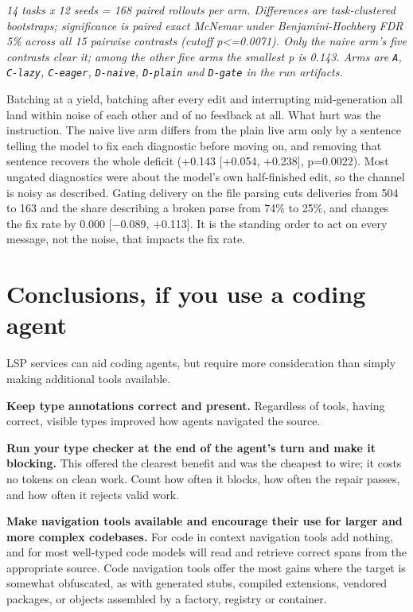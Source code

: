 \documentclass[
]{article}
\begin{document}
\emph{14 tasks x 12 seeds = 168 paired rollouts per arm. Differences are
task-clustered bootstraps; significance is paired exact McNemar under
Benjamini-Hochberg FDR 5\% across all 15 pairwise contrasts (cutoff
p\textless=0.0071). Only the naive arm's five contrasts clear it; among
the other five arms the smallest p is 0.143. Arms are \texttt{A},
\texttt{C-lazy}, \texttt{C-eager}, \texttt{D-naive}, \texttt{D-plain}
and \texttt{D-gate} in the run artifacts.}

Batching at a yield, batching after every edit and interrupting
mid-generation all land within noise of each other and of no feedback at
all. What hurt was the instruction. The naive live arm differs from the
plain live arm only by a sentence telling the model to fix each
diagnostic before moving on, and removing that sentence recovers the
whole deficit (+0.143 {[}+0.054, +0.238{]}, p=0.0022). Most ungated
diagnostics were about the model's own half-finished edit, so the
channel is noisy as described. Gating delivery on the file parsing cuts
deliveries from 504 to 163 and the share describing a broken parse from
74\% to 25\%, and changes the fix rate by 0.000 {[}−0.089, +0.113{]}. It
is the standing order to act on every message, not the noise, that
impacts the fix rate.

\section{Conclusions, if you use a coding
agent}\label{conclusions-if-you-use-a-coding-agent}

LSP services can aid coding agents, but require more consideration than
simply making additional tools available.

\textbf{Keep type annotations correct and present.} Regardless of tools,
having correct, visible types improved how agents navigated the source.

\textbf{Run your type checker at the end of the agent's turn and make it
blocking.} This offered the clearest benefit and was the cheapest to
wire; it costs no tokens on clean work. Count how often it blocks, how
often the repair passes, and how often it rejects valid work.

\textbf{Make navigation tools available and encourage their use for
larger and more complex codebases.} For code in context navigation tools
add nothing, and for most well-typed code models will read and retrieve
correct spans from the appropriate source. Code navigation tools offer
the most gains where the target is somewhat obfuscated, as with
generated stubs, compiled extensions, vendored packages, or objects
assembled by a factory, registry or container.
\end{document}
